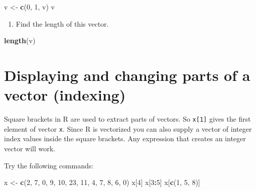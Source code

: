\documentclass[
]{book}
\newenvironment{Shaded}{\begin{snugshade}}{\end{snugshade}}
\newcommand{\DecValTok}[1]{\textcolor[rgb]{0.00,0.00,0.81}{#1}}
\newcommand{\FunctionTok}[1]{\textcolor[rgb]{0.13,0.29,0.53}{\textbf{#1}}}
\newcommand{\NormalTok}[1]{#1}
\newcommand{\OtherTok}[1]{\textcolor[rgb]{0.56,0.35,0.01}{#1}}
\newcommand{\SpecialCharTok}[1]{\textcolor[rgb]{0.81,0.36,0.00}{\textbf{#1}}}
\providecommand{\tightlist}{%
  \setlength{\itemsep}{0pt}\setlength{\parskip}{0pt}}
\begin{document}
\begin{Shaded}
\begin{Highlighting}[]
\NormalTok{v }\OtherTok{\textless{}{-}} \FunctionTok{c}\NormalTok{(}\DecValTok{0}\NormalTok{, }\DecValTok{1}\NormalTok{, v)}
\NormalTok{v}
\end{Highlighting}
\end{Shaded}

\begin{enumerate}
\def\labelenumi{\arabic{enumi}.}
\setcounter{enumi}{6}
\tightlist
\item
  Find the length of this vector.
\end{enumerate}

\begin{Shaded}
\begin{Highlighting}[]
\FunctionTok{length}\NormalTok{(v)}
\end{Highlighting}
\end{Shaded}

\section{Displaying and changing parts of a vector (indexing)}\label{displaying-and-changing-parts-of-a-vector-indexing}

Square brackets in R are used to extract parts of vectors. So
\texttt{x{[}1{]}} gives the first element of vector \texttt{x}. Since R is
vectorized you can also supply a vector of integer index values inside
the square brackets. Any expression that creates an integer vector
will work.

Try the following commands:

\begin{Shaded}
\begin{Highlighting}[]
\NormalTok{x }\OtherTok{\textless{}{-}} \FunctionTok{c}\NormalTok{(}\DecValTok{2}\NormalTok{, }\DecValTok{7}\NormalTok{, }\DecValTok{0}\NormalTok{, }\DecValTok{9}\NormalTok{, }\DecValTok{10}\NormalTok{, }\DecValTok{23}\NormalTok{, }\DecValTok{11}\NormalTok{, }\DecValTok{4}\NormalTok{, }\DecValTok{7}\NormalTok{, }\DecValTok{8}\NormalTok{, }\DecValTok{6}\NormalTok{, }\DecValTok{0}\NormalTok{)}
\NormalTok{x[}\DecValTok{4}\NormalTok{]}
\NormalTok{x[}\DecValTok{3}\SpecialCharTok{:}\DecValTok{5}\NormalTok{]}
\NormalTok{x[}\FunctionTok{c}\NormalTok{(}\DecValTok{1}\NormalTok{, }\DecValTok{5}\NormalTok{, }\DecValTok{8}\NormalTok{)]}
\end{Highlighting}
\end{Shaded}
\end{document}
